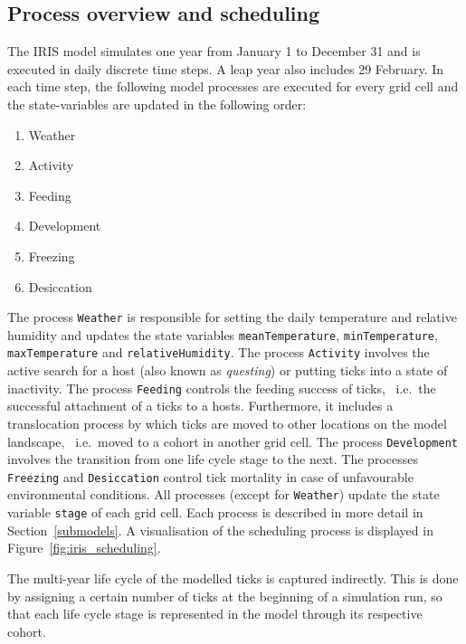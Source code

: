 \documentclass[a4paper, 11pt]{scrartcl}
\newcommand{\inlinecode}[1]{\texttt{\small #1}}
\begin{document}
\subsection{Process overview and scheduling}
The IRIS model simulates one year from January 1 to December 31 and is executed in daily discrete time steps. A leap year also includes 29 February. In each time step, the following model processes are executed for every grid cell and the state-variables are updated in the following order:

\begin{enumerate}[noitemsep]
	\item Weather
	\item Activity
	\item Feeding
	\item Development
	\item Freezing
	\item Desiccation
\end{enumerate}

The process \inlinecode{Weather} is responsible for setting the daily temperature and relative humidity and updates the state variables \inlinecode{meanTemperature}, \inlinecode{minTemperature}, \inlinecode{maxTemperature} and \inlinecode{relativeHumidity}. The process \inlinecode{Activity} involves the active search for a host (also known as \textit{questing}) or putting ticks into a state of inactivity. The process \inlinecode{Feeding} controls the feeding success of ticks, ~i.e.\ the successful attachment of a ticks to a hosts. Furthermore, it includes a translocation process by which ticks are moved to other locations on the model landscape, ~i.e.\ moved to a cohort in another grid cell. The process \inlinecode{Development} involves the transition from one life cycle stage to the next. The processes \inlinecode{Freezing} and \inlinecode{Desiccation} control tick mortality in case of unfavourable environmental conditions. All processes (except for \inlinecode{Weather}) update the state variable \inlinecode{stage} of each grid cell. Each process is described in more detail in Section~\ref{submodels}. A visualisation of the scheduling process is displayed in Figure~\ref{fig:iris_scheduling}.

The multi-year life cycle of the modelled ticks is captured indirectly. This is done by assigning a certain number of ticks at the beginning of a simulation run, so that each life cycle stage is represented in the model through its respective cohort.
\end{document}
